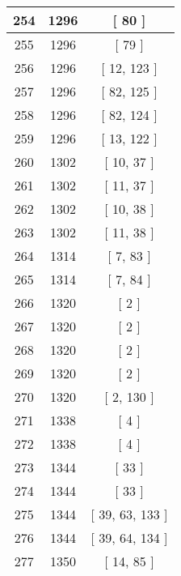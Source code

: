 \begin{center}
\begin{longtable}[H]{|| c c c ||}
254 & 1296 & [ 80 ] \\ 
\hline
255 & 1296 & [ 79 ] \\ 
\hline
256 & 1296 & [ 12, 123 ] \\ 
\hline
257 & 1296 & [ 82, 125 ] \\ 
\hline
258 & 1296 & [ 82, 124 ] \\ 
\hline
259 & 1296 & [ 13, 122 ] \\ 
\hline
260 & 1302 & [ 10, 37 ] \\ 
\hline
261 & 1302 & [ 11, 37 ] \\ 
\hline
262 & 1302 & [ 10, 38 ] \\ 
\hline
263 & 1302 & [ 11, 38 ] \\ 
\hline
264 & 1314 & [ 7, 83 ] \\ 
\hline
265 & 1314 & [ 7, 84 ] \\ 
\hline
266 & 1320 & [ 2 ] \\ 
\hline
267 & 1320 & [ 2 ] \\ 
\hline
268 & 1320 & [ 2 ] \\ 
\hline
269 & 1320 & [ 2 ] \\ 
\hline
270 & 1320 & [ 2, 130 ] \\ 
\hline
271 & 1338 & [ 4 ] \\ 
\hline
272 & 1338 & [ 4 ] \\ 
\hline
273 & 1344 & [ 33 ] \\ 
\hline
274 & 1344 & [ 33 ] \\ 
\hline
275 & 1344 & [ 39, 63, 133 ] \\ 
\hline
276 & 1344 & [ 39, 64, 134 ] \\ 
\hline
277 & 1350 & [ 14, 85 ] \\ 
\hline
278 & 1350 & [ 14, 86 ] \\ 
\hline
279 & 1368 & [ 16, 65 ] \\ 
\hline
280 & 1368 & [ 17, 65, 87 ] \\ 
\hline
281 & 1368 & [ 16, 66 ] \\ 
\hline
282 & 1368 & [ 17, 66, 88 ] \\ 
\hline
283 & 1374 & [ 4 ] \\ 
\hline
284 & 1374 & [ 4 ] \\ 
\hline
285 & 1422 & [ 7, 89 ] \\ 
\hline
286 & 1422 & [ 7, 90 ] \\ 
\hline
287 & 1440 & [ 8, 68, 142 ] \\ 
\hline
288 & 1440 & [ 9, 67 ] \\ 
\hline
289 & 1440 & [ 142 ] \\ 

\end{longtable}
\end{center}
